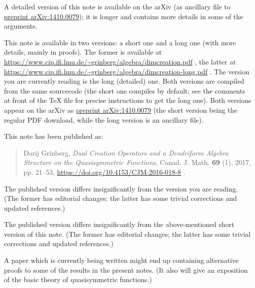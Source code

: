 \documentclass
[numbers=enddot,12pt,final,onecolumn,notitlepage,abstracton]{scrartcl}%
\theoremstyle{definition}
\newenvironment{verlong}{}{}
\newenvironment{vershort}{}{}
\newenvironment{noncompile}{}{}
\begin{document}
\begin{vershort}
A detailed version of this note is available on the arXiv (as ancillary file
to \href{https://arxiv.org/abs/1410.0079}{preprint arXiv:1410.0079}); it is
longer and contains more details in some of the arguments.
\end{vershort}

\begin{verlong}
This note is available in two versions: a short one and a long one (with more
details, mainly in proofs). The former is available at \newline%
\url{https://www.cip.ifi.lmu.de/~grinberg/algebra/dimcreation.pdf} , the
latter at \newline%
\url{https://www.cip.ifi.lmu.de/~grinberg/algebra/dimcreation-long.pdf} . The
version you are currently reading is the long (detailed) one. Both versions
are compiled from the same sourcecode (the short one compiles by default; see
the comments at front of the TeX file for precise instructions to get the long
one). Both versions appear on the arXiv as
\href{https://arxiv.org/abs/1410.0079}{preprint arXiv:1410.0079} (the short
version being the regular PDF download, while the long version is an ancillary file).
\end{verlong}

This note has been published as:

\begin{quote}
Darij Grinberg, \textit{Dual Creation Operators and a Dendriform Algebra
Structure on the Quasisymmetric Functions}, Canad. J. Math. \textbf{69} (1),
2017, pp. 21--53, \url{https://doi.org/10.4153/CJM-2016-018-8} .
\end{quote}

\begin{vershort}
The published version differs insignificantly from the version you are
reading. (The former has editorial changes; the latter has some trivial
corrections and updated references.)
\end{vershort}

\begin{verlong}
The published version differs insignificantly from the above-mentioned short
version of this note. (The former has editorial changes; the latter has some
trivial corrections and updated references.)
\end{verlong}

\begin{noncompile}
A paper \cite{Gri-gammapart} which is currently being written might end up
containing alternative proofs to some of the results in the present notes. (It
also will give an exposition of the basic theory of quasisymmetric functions.)
\end{noncompile}
\end{document}
